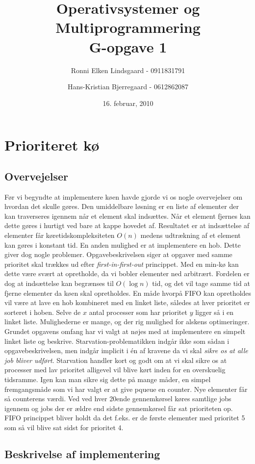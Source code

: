 \documentclass{article}
\title{Operativsystemer og Multiprogrammering\\G-opgave 1}
\author{Ronni Elken Lindsgaard - 0911831791 \and
Hans-Kristian Bjerregaard - 0612862087}
\date{16. februar, 2010}
\begin{document}
\maketitle
\newpage
\section{Prioriteret kø}
\subsection{Overvejelser}
Før vi begyndte at implementere køen havde gjorde vi os nogle overvejelser om hvordan det skulle gøres. Den umiddelbare løsning er en liste af elementer der kan traverseres igennem når et element skal indsættes. Når et element fjernes kan dette gøres i hurtigt ved bare at kappe hovedet af. Resultatet er at indsættelse af elementer får køretidskompleksiteten $O(n)$ medens udtrækning af et element kan gøres i konstant tid.
En anden mulighed er at implementere en hob. Dette giver dog nogle problemer. Opgavebeskrivelsen siger at opgaver med samme prioritet skal trækkes ud efter \emph{first-in-first-out} princippet. Med en min-kø kan dette være svært at opretholde, da vi bobler elementer ned arbitrært. Fordelen er dog at indsættelse kan begrænses til $O(\log{n})$ tid, og det vil tage samme tid at fjerne elementer da køen skal opretholdes. En måde hvorpå FIFO kan opretholdes vil være at lave en hob kombineret med en linket liste, således at hver prioritet er sorteret i hoben. Selve de $x$ antal processer som har prioritet $y$ ligger så i en linket liste. 
Mulighederne er mange, og der rig mulighed for alskens optimeringer. Grundet opgavens omfang har vi valgt at nøjes med at implementere en simpelt linket liste og beskrive.
Starvation-problematikken indgår ikke som sådan i opgavebeskrivelsen, men indgår implicit i én af kravene da vi skal {\it sikre os at alle job bliver udført}. Starvation handler kort og godt om at vi skal sikre os at processer med lav prioritet alligevel vil blive kørt inden for en overskuelig tidsramme. Igen kan man sikre sig dette på mange måder, en simpel fremgangsmåde som vi har valgt er at give pqueue en counter. Nye elementer får så counterens værdi. Ved ved hver 20ende gennemkørsel køres samtlige jobs igennem og jobs der er ældre end sidste gennemkørsel får sat prioriteten op. FIFO princippet bliver holdt da det f.eks. er de første elementer med prioritet 5 som så vil blive sat sidst for prioritet 4.
\subsection{Beskrivelse af implementering}
\end{document}
